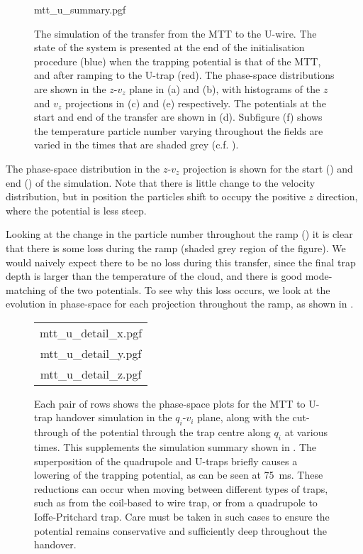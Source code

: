 \begin{figure}[p]
\centering
  {mtt_u_summary.pgf}
  \caption{
    The simulation of the transfer from the MTT to the U-wire. The state of the
    system is presented at the end of the initialisation procedure (blue) when
    the trapping potential is that of the MTT, and after ramping to the U-trap
    (red). The phase-space distributions are shown in the $z$-$v_z$ plane in
    (a) and (b), with histograms of the $z$ and $v_z$ projections in (c) and
    (e) respectively. The potentials at the start and end of the transfer are
    shown in (d). Subfigure (f) shows the temperature particle number varying
    throughout the fields are varied in the times that are shaded grey (c.f.
    ). 
  }
  \label{design:fig:mttusim}
\end{figure}

The phase-space distribution in the $z$-$v_z$ projection is shown for the start
() and end
() of the simulation. Note that there is
little change to the velocity distribution, but in position the particles shift
to occupy the positive $z$ direction, where the potential is less steep.

Looking at the change in the particle number throughout the ramp
() it is clear that there is some loss
during the ramp (shaded grey region of the figure). We would naively expect
there to be no loss during this transfer, since the final trap depth is larger
than the temperature of the cloud, and there is good mode-matching of the two
potentials. To see why this loss occurs, we  look at the evolution in
phase-space for each projection throughout the ramp, as shown in
.

\begin{figure}[htp]
\centering
  \begin{tabular}{c}
  {mtt_u_detail_x.pgf} \\
  {mtt_u_detail_y.pgf} \\
  {mtt_u_detail_z.pgf}
  \end{tabular}
  \caption{
    Each pair of rows shows the phase-space plots for the MTT to U-trap
    handover simulation in the $q_i$-$v_i$ plane, along with the cut-through of
    the potential through the trap centre along $q_i$ at various times. This
    supplements the simulation summary shown in .
    The superposition of the quadrupole and U-traps briefly causes a lowering
    of the trapping potential, as can be seen at \SI{75}{\milli\second}. These
    reductions can occur when moving between different types of traps, such as
    from the coil-based to wire trap, or from a quadrupole to Ioffe-Pritchard
    trap. Care must be taken in such cases to ensure the potential remains
    conservative and sufficiently deep throughout the handover.
}
  \label{design:fig:mttudetail}
\end{figure}

